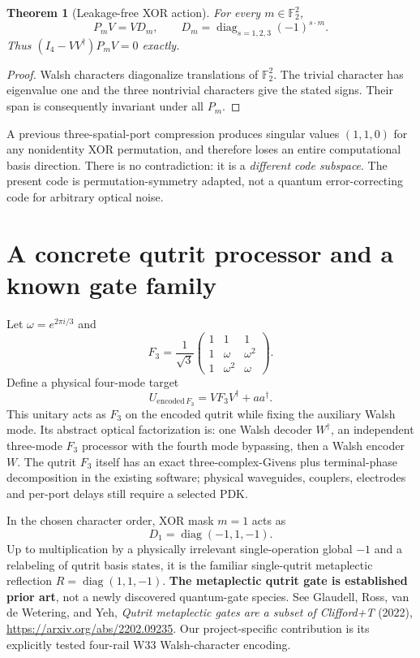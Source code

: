 \documentclass[10pt]{article}
\newtheorem{theorem}{Theorem}
\begin{document}
\begin{theorem}[Leakage-free XOR action]
For every $m\in\mathbb F_2^2$,
\[
 P_m V=VD_m,\qquad
 D_m=\operatorname{diag}_{s=1,2,3}(-1)^{s\cdot m}.
\]
Thus $(I_4-VV^\dagger)P_mV=0$ exactly.
\end{theorem}
\begin{proof}
Walsh characters diagonalize translations of $\mathbb F_2^2$.
The trivial character has eigenvalue one and the three
nontrivial characters give the stated signs. Their span
is consequently invariant under all $P_m$.
\end{proof}
A previous three-spatial-port compression produces singular
values $(1,1,0)$ for any nonidentity XOR permutation, and
therefore loses an entire computational basis direction.
There is no contradiction: it is a \emph{different code
subspace}. The present code is permutation-symmetry adapted,
not a quantum error-correcting code for arbitrary optical noise.

\section{A concrete qutrit processor and a known gate family}
Let $\omega=e^{2\pi i/3}$ and
\[
 F_3=\frac1{\sqrt3}
 \begin{pmatrix}
 1&1&1\\1&\omega&\omega^2\\1&\omega^2&\omega
 \end{pmatrix}.
\]
Define a physical four-mode target
\[
 U_{\mathrm{encoded}\,F_3}
 =VF_3V^\dagger+aa^\dagger.
\]
This unitary acts as $F_3$ on the encoded qutrit while
fixing the auxiliary Walsh mode. Its abstract optical
factorization is: one Walsh decoder $W^\dagger$,
an independent three-mode $F_3$ processor with
the fourth mode bypassing, then a Walsh encoder $W$.
The qutrit $F_3$ itself has an exact three-complex-Givens
plus terminal-phase decomposition in the existing software;
physical waveguides, couplers, electrodes and per-port delays
still require a selected PDK.

In the chosen character order, XOR mask $m=1$
acts as
\[
 D_1=\operatorname{diag}(-1,1,-1).
\]
Up to multiplication by a physically irrelevant
single-operation global $-1$ and a relabeling of qutrit
basis states, it is the familiar single-qutrit
metaplectic reflection $R=\operatorname{diag}(1,1,-1)$.
\textbf{The metaplectic qutrit gate is established prior art},
not a newly discovered quantum-gate species.
See Glaudell, Ross, van de Wetering, and Yeh,
\emph{Qutrit metaplectic gates are a subset of
Clifford+T} (2022), \url{https://arxiv.org/abs/2202.09235}.
Our project-specific contribution is its explicitly tested
four-rail W33 Walsh-character encoding.
\end{document}
